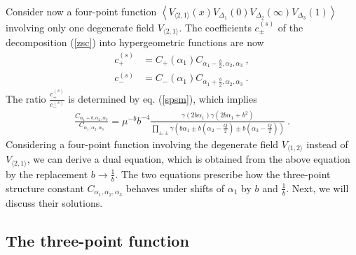 \documentclass[12pt,a4paper,notitlepage]{report}
\newcommand \la {\left\langle}
\newcommand \ra {\right\rangle}
\numberwithin{equation}{section}
\theoremstyle{break}
\begin{document}
Consider now a four-point function $\la V_{\langle 2,1 \rangle}(x)V_{\Delta_1}(0)V_{\Delta_2}(\infty)V_{\Delta_3}(1)\ra$ involving only one degenerate field $V_{\langle 2,1 \rangle}$. The coefficients $c^{(s)}_\pm$ of the decomposition (\ref{zsc}) into hypergeometric functions are now 
\begin{align}
 c_+^{(s)} & = C_+(\alpha_1) C_{\alpha_1-\frac{b}{2},\alpha_2,\alpha_3} \ ,
\\
c_-^{(s)} & = C_-(\alpha_1) C_{\alpha_1+\frac{b}{2},\alpha_2,\alpha_3}\ .
\end{align}
The ratio $\frac{c_+^{(s)}}{c_-^{(s)}}$ is determined by eq. (\ref{spsm}), which implies
\begin{align}
 \frac{C_{\alpha_1+b,\alpha_2,\alpha_3}}{C_{\alpha_1,\alpha_2,\alpha_3}} = \mu^{-b} b^{-4}\frac{\gamma(2b\alpha_1)\gamma(2b\alpha_1+b^2)}{\prod_{\pm,\pm} \gamma\left(b\alpha_1\pm b(\alpha_2-\frac{Q}{2})\pm b(\alpha_3-\frac{Q}{2})\right)}\ .
\label{fcc}
\end{align}
Considering a four-point function involving the degenerate field $V_{\langle 1,2 \rangle}$ instead of $V_{\langle 2,1 \rangle}$, we can derive a dual equation, which is obtained from the above equation by the replacement $b\rightarrow \frac{1}{b}$. 
The two equations prescribe how the three-point structure constant $C_{\alpha_1,\alpha_2,\alpha_3}$ behaves under shifts of $\alpha_1$ by $b$ and $\frac{1}{b}$. Next, we will discuss their solutions.


\subsection{The three-point function \label{sectpf}}
\end{document}
